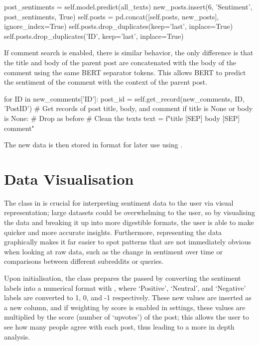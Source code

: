 \begin{python}
post_sentiments = self.model.predict(all_texts)
new_posts.insert(6, 'Sentiment', post_sentiments, True)
self.posts = pd.concat([self.posts, new_posts], ignore_index=True)
self.posts.drop_duplicates(keep='last', inplace=True)
self.posts.drop_duplicates('ID', keep='last', inplace=True)
\end{python}

If comment search is enabled, there is similar behavior, the only difference is that the title and body of the parent post are concatenated with the body of the comment using the same BERT separator tokens. This allows BERT to predict the sentiment of the comment with the context of the parent post.

\begin{python}
for ID in new_comments['ID']:
    post_id = self.get_record(new_comments, ID, 'PostID')
    # Get records of post title, body, and comment
    if title is None or body is None:
        # Drop as before
    # Clean the texts
    text = f"{title} [SEP] {body} [SEP] {comment}"
\end{python}

The new data is then stored in  format for later use using .

\section{Data Visualisation}
The  class in  is crucial for interpreting sentiment data to the user via visual representation; large datasets could be overwhelming to the user, so by visualising the data and breaking it up into more digestible formats, the user is able to make quicker and more accurate insights. Furthermore, representing the data graphically makes it far easier to spot patterns that are not immediately obvious when looking at raw data, such as the change in sentiment over time or comparisons between different subreddits or queries.

Upon initialisation, the  class prepares the passed  by converting the sentiment labels into a numerical format with , where `Positive', `Neutral', and `Negative' labels are converted to 1, 0, and -1 respectively. These new values are inserted as a new column, and if weighting by score is enabled in settings, these values are multiplied by the score (number of `upvotes') of the post; this allows the user to see how many people agree with each post, thus leading to a more in depth analysis. 

